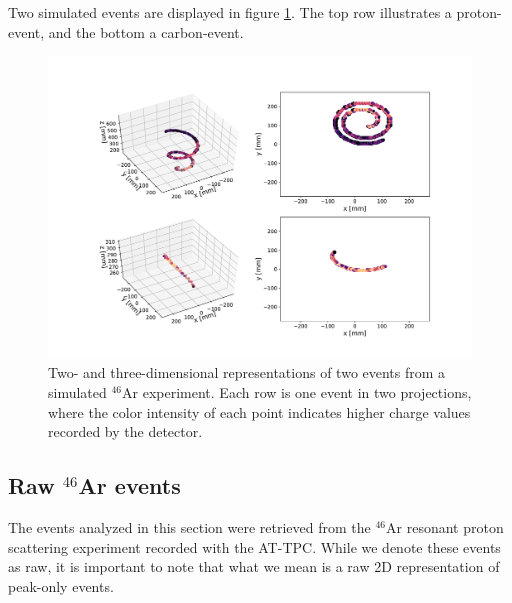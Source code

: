\documentclass[review,number,sort&compress]{elsarticle}
\begin{document}
Two simulated events are displayed in figure \ref{fig:sim_samples}. The top row illustrates a proton-event, and the bottom a carbon-event. 

\begin{figure}[ht]
\centering
\includegraphics[width=\textwidth]{plots/display_eventssimulated.pdf}
\caption[Displaying simulated events in 2D and 3D]{Two- and three-dimensional representations of two events from a simulated ${}^{46}$Ar experiment. Each row is one event in two projections, where the color intensity of each point indicates higher charge values recorded by the detector.}\label{fig:sim_samples}
\end{figure}


\subsection{Raw \texorpdfstring{${}^{46}$Ar}{46Ar}  events}\label{sec:data_real}

The events analyzed in this section were retrieved from the ${}^{46}$Ar resonant proton scattering experiment recorded with the AT-TPC. 
While we denote these events as raw, it is important to note that what we mean is a raw 2D representation of peak-only events.

\end{document}
